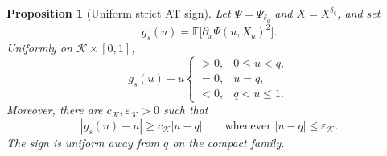 \documentclass[11pt]{article}
\numberwithin{equation}{section}
\theoremstyle{plain}
\newtheorem{proposition}[theorem]{Proposition}
\theoremstyle{definition}
\newcommand{\E}{\mathbb E}
\newcommand{\1}{\mathbf 1}
\newcommand{\cK}{\mathcal K}
\begin{document}
\begin{proposition}[Uniform strict AT sign]
\label{prop:pathRS}
Let $\Psi=\Psi_{\delta_q}$ and $X=X^{\delta_q}$, and set
\[
 g_s(u)=\E\bigl[\partial_x\Psi(u,X_u)^2\bigr].
\]
Uniformly on $\cK\times[0,1]$,
\begin{equation}
 g_s(u)-u
 \begin{cases}
 >0,&0\le u<q,\\
 =0,&u=q,\\
 <0,&q<u\le1.
 \end{cases}
 \label{eq:ATsign}
\end{equation}
Moreover, there are $c_{\cK},\varepsilon_{\cK}>0$ such that
\begin{equation}
 |g_s(u)-u|\ge c_{\cK}|u-q|
 \qquad\text{whenever }|u-q|\le\varepsilon_{\cK}.
 \label{eq:linearATsign}
\end{equation}
The sign is uniform away from $q$ on the compact family.
\end{proposition}
\end{document}
